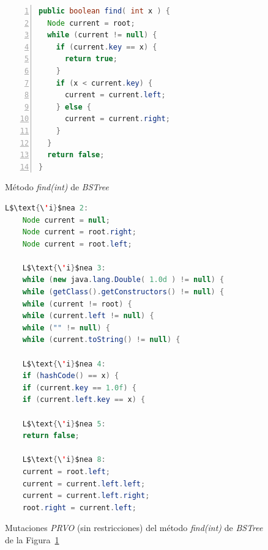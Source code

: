 \begin{figure}
	\begin{lstlisting}[frame=single, numbers=left, mathescape=true,language=Java,basicstyle={},framexleftmargin=.073\textwidth,xleftmargin=.085\textwidth,xrightmargin=0.012\textwidth]
public boolean find( int x ) {
  Node current = root;
  while (current != null) {
    if (current.key == x) {
      return true;
    }
    if (x < current.key) {
      current = current.left;
    } else {
      current = current.right;
    }
  }
  return false;
}
	\end{lstlisting}
	\caption{M\'etodo \emph{find(int)} de \emph{BSTree}}
	\label{figures.examples.prvoExpl.findMethod}
\end{figure}

\begin{figure}
	\begin{lstlisting}[mathescape=true,language=Java,basicstyle={}]
	L$\text{\'i}$nea 2:
	Node current = null;
	Node current = root.right;
	Node current = root.left;
	
	L$\text{\'i}$nea 3:
	while (new java.lang.Double( 1.0d ) != null) {
	while (getClass().getConstructors() != null) {
	while (current != root) {
	while (current.left != null) {
	while ("" != null) {
	while (current.toString() != null) {
	
	L$\text{\'i}$nea 4:
	if (hashCode() == x) {
	if (current.key == 1.0f) {
	if (current.left.key == x) {
	
	L$\text{\'i}$nea 5:
	return false;
	
	L$\text{\'i}$nea 8:
	current = root.left;
	current = current.left.left;
	current = current.left.right;
	root.right = current.left;
	\end{lstlisting}
	\caption[Mutaciones \emph{PRVO} para \emph{find(int)}]{Mutaciones \emph{PRVO} (sin restricciones) del m\'etodo \emph{find(int)} de \emph{BSTree} de la Figura~\ref{figures.examples.prvoExpl.findMethod}}
	\label{figures.examples.prvoExpl.mutations}
\end{figure}

